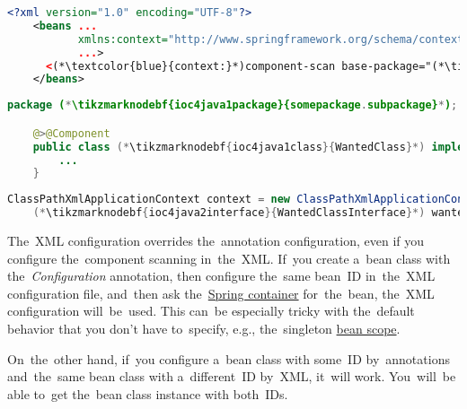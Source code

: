 \begin{lstlisting}[language=XML, title={Configuration XML}]
    <?xml version="1.0" encoding="UTF-8"?>
    <beans ...
           xmlns:context="http://www.springframework.org/schema/context"
           ...>
      <(*\textcolor{blue}{context:}*)component-scan base-package="(*\tikzmarknodebf{ioc4xml1package}{somepackage.subpackage}[ForestGreen]*)"/>
    </beans>
\end{lstlisting}
\begin{lstlisting}[language=Java, title={Wanted class}]
    package (*\tikzmarknodebf{ioc4java1package}{somepackage.subpackage}*);

    @>@Component
    public class (*\tikzmarknodebf{ioc4java1class}{WantedClass}*) implements (*\tikzmarknodebf{ioc4java1interface}{WantedClassInterface}*) {
        ...
    }
\end{lstlisting}
\begin{lstlisting}[language=Java, title={Usage}]
    ClassPathXmlApplicationContext context = new ClassPathXmlApplicationContext("configurationFile.xml");
    (*\tikzmarknodebf{ioc4java2interface}{WantedClassInterface}*) wantedClassInstance = context.getBean("(*\tikzmarknodebf{ioc4java2beanid}{wantedClass}[ForestGreen]*)", (*\tikzmarknodebf{ioc4java2interface2}{WantedClassInterface}*).class);
\end{lstlisting}

\warningnonl The~XML configuration overrides the~annotation configuration, even if you configure the~component scanning in~the~XML. If~you create a~bean class with the~\textit{Configuration} annotation, then configure the~same bean~ID in~the~XML configuration file, and~then ask the~\hyperref[springcontainrer]{Spring container} for~the~bean, the~XML configuration will~be~used. This can~be especially tricky with the~default behavior that you don't have to~specify, e.g., the~singleton \hyperref[beanscope]{bean scope}.

On~the~other hand, if~you configure a~bean class with some~ID by~annotations and~the~same bean class with a~different~ID by~XML, it~will work. You~will~be able to~get the~bean class instance with both~IDs.

